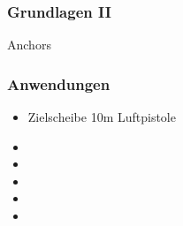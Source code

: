 \documentclass[14pt,ngerman]{beamer}
\begin{document}
\begin{frame}
\frametitle{Grundlagen II}

Anchors
\end{frame}

\begin{frame}
\frametitle{Anwendungen}

\begin{itemize}
	\item Zielscheibe 10m Luftpistole
	\item 
	\item 
	\item 
	\item 
	\item 
	\end{itemize}

\end{frame}
\end{document}
